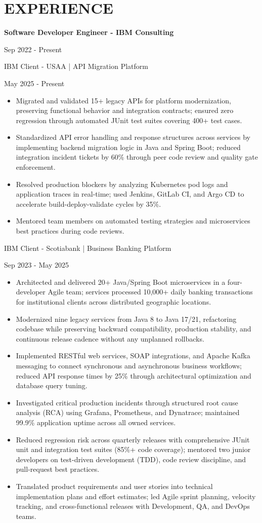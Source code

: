 \documentclass[10pt,a4paper]{article}
\newlength{\rolefontsize}
\newlength{\clientfontsize}
\newlength{\singlelinespacing}
\newlength{\singleseparation}
\newcommand{\role}[1]{
  \vspace{\singleseparation}
  {\fontsize{\rolefontsize}{\singlelinespacing} \selectfont \bfseries #1 \par}
  \nopagebreak}
\newcommand{\client}[1]{
  \vspace{\singleseparation}
  {\fontsize{\clientfontsize}{\singlelinespacing} \selectfont #1 \par} 
  \nopagebreak}
\begin{document}
\section*{EXPERIENCE}
\role{Software Developer Engineer - IBM Consulting}
Sep 2022 - Present \par
\client{IBM Client - USAA | API Migration Platform}
May 2025 - Present \par
\begin{itemize}
  \item Migrated and validated 15+ legacy APIs for platform modernization, preserving functional behavior and integration contracts; ensured zero regression through automated JUnit test suites covering 400+ test cases.
  \item Standardized API error handling and response structures across services by implementing backend migration logic in Java and Spring Boot; reduced integration incident tickets by 60\% through peer code review and quality gate enforcement.
  \item Resolved production blockers by analyzing Kubernetes pod logs and application traces in real-time; used Jenkins, GitLab CI, and Argo CD to accelerate build-deploy-validate cycles by 35\%.
  \item Mentored team members on automated testing strategies and microservices best practices during code reviews.
\end{itemize}
\client{IBM Client - Scotiabank | Business Banking Platform}
Sep 2023 - May 2025 \par
\begin{itemize}
  \item Architected and delivered 20+ Java/Spring Boot microservices in a four-developer Agile team; services processed 10,000+ daily banking transactions for institutional clients across distributed geographic locations.
  \item Modernized nine legacy services from Java 8 to Java 17/21, refactoring codebase while preserving backward compatibility, production stability, and continuous release cadence without any unplanned rollbacks.
  \item Implemented RESTful web services, SOAP integrations, and Apache Kafka messaging to connect synchronous and asynchronous business workflows; reduced API response times by 25\% through architectural optimization and database query tuning.
  \item Investigated critical production incidents through structured root cause analysis (RCA) using Grafana, Prometheus, and Dynatrace; maintained 99.9\% application uptime across all owned services.
  \item Reduced regression risk across quarterly releases with comprehensive JUnit unit and integration test suites (85\%+ code coverage); mentored two junior developers on test-driven development (TDD), code review discipline, and pull-request best practices.
  \item Translated product requirements and user stories into technical implementation plans and effort estimates; led Agile sprint planning, velocity tracking, and cross-functional releases with Development, QA, and DevOps teams.
\end{itemize}
\end{document}
